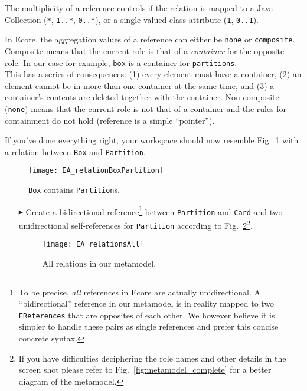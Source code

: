 The multiplicity of a reference controls if the relation is mapped to a Java Collection (\texttt{*},  \texttt{1..*}, \texttt{0..*}), or a single valued class attribute (\texttt{1}, \texttt{0..1}).

In Ecore, the aggregation values of a reference can either be \texttt{none} or \texttt{com\-po\-site}.
Composite means that the current role is that of a \emph{container} for the opposite role.
In our case for example, \texttt{box} is a container for \texttt{partitions}.\\
This has a series of consequences: (1) every element must have a container, (2) an element cannot be in more than one container at the same time, and (3) a container's contents are deleted together with the container.
Non-composite (\texttt{none}) means that the current role is not that of a container and the rules for containment do not hold (reference is a simple ``pointer'').

If you've done everything right, your workspace should now resemble Fig.~\ref{fig:ereference_completed} with a relation between \texttt{Box} and \texttt{Partition}.

\begin{figure}[htbp]
	\centering
  \texttt{[image: EA\_relationBoxPartition]}
	\caption{\texttt{Box} contains \texttt{Partition}s.}
	\label{fig:ereference_completed}
\end{figure}
\FloatBarrier

\begin{enumerate}
\item[$\blacktriangleright$] Create a bidirectional reference\footnote{To be precise, \emph{all} references in Ecore are actually unidirectional.
A ``bidirectional'' reference in our metamodel is in reality mapped to two \texttt{EReferences} that are opposites of each other.
We however believe it is simpler to handle these pairs as single references and prefer this concise concrete syntax.} between \texttt{Partition} and \texttt{Card} and two unidirectional self-references for \texttt{Partition} according to Fig.~\ref{fig:ereferences_all}\footnote{If you have difficulties deciphering the role names and other details in the screen shot please refer to Fig.~\ref{fig:metamodel_complete} for a better diagram of the metamodel.}.

\begin{figure}[htbp]
	\centering
  \texttt{[image: EA\_relationsAll]}
	\caption{All relations in our metamodel.}
	\label{fig:ereferences_all}
\end{figure}
\end{enumerate}
\FloatBarrier


